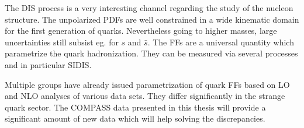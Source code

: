 The DIS process is a very interesting channel regarding the study of the nucleon structure. The unpolarized PDFs are well constrained in a wide kinematic domain for the first generation of quarks. Nevertheless going to higher masses, large uncertainties still subsist eg. for $s$ and $\bar{s}$. The FFs are a universal quantity which parametrize the quark hadronization. They can be measured via several processes and in particular SIDIS.

Multiple groups have already issued parametrization of quark FFs based on LO and NLO analyses of various data sets. They differ significantly in the strange quark sector. The COMPASS data presented in this thesis will provide a significant amount of new data which will help solving the discrepancies.
